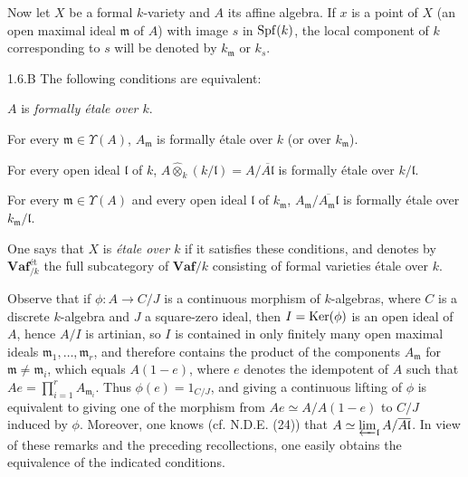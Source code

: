 Now let $X$ be a formal $k$-variety and $A$ its affine algebra. If $x$ is a point of $X$ (\ie an open maximal ideal $\mathfrak m$ of $A$) with image $s$ in $\operatorname{Spf}(k)$, the local component of $k$ corresponding to $s$ will be denoted by $k_{\mathfrak m}$ or $k_s$.
\begin{definition}{1.6.B}\label{VIIB.1.6.B}
The following conditions are equivalent:
\begin{enumeratea}
\item $A$ is \emph{formally étale over $k$}.
\item For every $\mathfrak m\in\Upsilon(A)$, $A_{\mathfrak m}$ is formally étale over $k$ (or over $k_{\mathfrak m}$).
\item For every open ideal $\mathfrak l$ of $k$, $A\widehat\otimes_k(k/\mathfrak l)=A/\overline{A\mathfrak l}$ is formally étale over $k/\mathfrak l$.
\item For every $\mathfrak m\in\Upsilon(A)$ and every open ideal $\mathfrak l$ of $k_{\mathfrak m}$, $A_{\mathfrak m}/\overline{A_{\mathfrak m}\mathfrak l}$ is formally étale over $k_{\mathfrak m}/\mathfrak l$.
\end{enumeratea}
One says that $X$ is \emph{étale over $k$} if it satisfies these conditions, and denotes by $\mathbf{Vaf}_{/k}^{\text{ét}}$ the full subcategory of $\mathbf{Vaf}/k$ consisting of formal varieties étale over $k$.
\end{definition}
Observe that if $\phi:A\to C/J$ is a continuous morphism of $k$-algebras, where $C$ is a discrete $k$-algebra and $J$ a square-zero ideal, then $I=\operatorname{Ker}(\phi)$ is an open ideal of $A$, hence $A/I$ is artinian, so $I$ is contained in only finitely many open maximal ideals $\mathfrak m_1,\ldots,\mathfrak m_r$, and therefore contains the product of the components $A_{\mathfrak m}$ for $\mathfrak m\ne\mathfrak m_i$, which equals $A(1-e)$, where $e$ denotes the idempotent of $A$ such that $Ae=\prod_{i=1}^r A_{\mathfrak m_i}$. Thus $\phi(e)=1_{C/J}$, and giving a continuous lifting of $\phi$ is equivalent to giving one of the morphism from $Ae\simeq A/A(1-e)$ to $C/J$ induced by $\phi$.
Moreover, one knows (cf. N.D.E. (24)) that $A\simeq\varprojlim_{\mathfrak l}A/\overline{A\mathfrak l}$. In view of these remarks and the preceding recollections, one easily obtains the equivalence of the indicated conditions.

